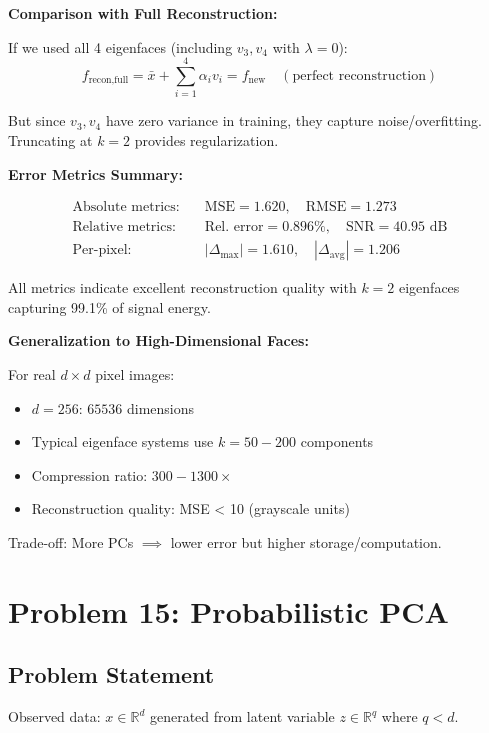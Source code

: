 \documentclass[12pt]{article}
\begin{document}
\begin{explanation}
\textbf{Comparison with Full Reconstruction:}

If we used all 4 eigenfaces (including $v_3, v_4$ with $\lambda = 0$):
\[
f_{\text{recon,full}} = \bar{x} + \sum_{i=1}^4 \alpha_i v_i = f_{\text{new}} \quad (\text{perfect reconstruction})
\]

But since $v_3, v_4$ have zero variance in training, they capture noise/overfitting. Truncating at $k=2$ provides regularization.

\textbf{Error Metrics Summary:}

\begin{align*}
\text{Absolute metrics:} &\quad \text{MSE} = 1.620, \quad \text{RMSE} = 1.273 \\
\text{Relative metrics:} &\quad \text{Rel. error} = 0.896\%, \quad \text{SNR} = 40.95 \text{ dB} \\
\text{Per-pixel:} &\quad |\Delta_{\max}| = 1.610, \quad |\Delta_{\text{avg}}| = 1.206
\end{align*}

All metrics indicate excellent reconstruction quality with $k=2$ eigenfaces capturing 99.1\% of signal energy.

\textbf{Generalization to High-Dimensional Faces:}

For real $d \times d$ pixel images:
\begin{itemize}
    \item $d = 256$: $65536$ dimensions
    \item Typical eigenface systems use $k = 50-200$ components
    \item Compression ratio: $300-1300\times$
    \item Reconstruction quality: MSE < 10 (grayscale units)
\end{itemize}

Trade-off: More PCs $\implies$ lower error but higher storage/computation.

\end{explanation}

\newpage
\section{Problem 15: Probabilistic PCA}

\subsection{Problem Statement}

Observed data: \(x \in \mathbb{R}^d\) generated from latent variable \(z \in \mathbb{R}^q\) where \(q < d\).
\end{document}
